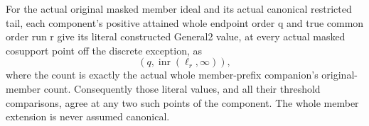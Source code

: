 \begin{lemma}
\label{hir:member-masked-positive-literal-value}
\leanok
For the actual original masked member ideal and its actual canonical
restricted tail, each component's positive attained whole endpoint order
q and true common order run r give its literal constructed General2 value,
at every actual masked cosupport point off the discrete exception, as
\[
 (q,\operatorname{inr}(\ell_r,\infty)),
\]
where the count is exactly the actual whole member-prefix companion's
original-member count. Consequently those literal values, and all their
threshold comparisons, agree at any two such points of the component.
The whole member extension is never assumed canonical.
\end{lemma}
